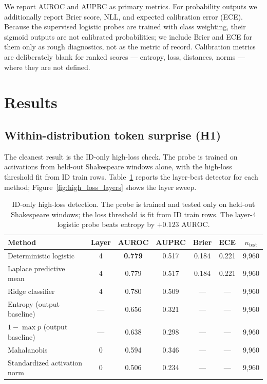 \documentclass[11pt]{article}
\begin{document}
We report AUROC and AUPRC as primary metrics. For probability outputs we additionally report Brier score, NLL, and expected calibration error (ECE). Because the supervised logistic probes are trained with class weighting, their sigmoid outputs are not calibrated probabilities; we include Brier and ECE for them only as rough diagnostics, not as the metric of record. Calibration metrics are deliberately blank for ranked scores --- entropy, loss, distances, norms --- where they are not defined.

\section{Results}

\subsection{Within-distribution token surprise (H1)}

The cleanest result is the ID-only high-loss check. The probe is trained on activations from held-out Shakespeare windows alone, with the high-loss threshold fit from ID train rows. Table~\ref{tab:idonly} reports the layer-best detector for each method; Figure~\ref{fig:high_loss_layers} shows the layer sweep.

\begin{table}[h]
  \centering
  \small
  \begin{tabular}{lcccccc}
    \toprule
    Method & Layer & AUROC & AUPRC & Brier & ECE & $n_{\mathrm{test}}$ \\
    \midrule
    Deterministic logistic       & 4 & \textbf{0.779} & 0.517 & 0.184 & 0.221 & 9{,}960 \\
    Laplace predictive mean      & 4 & 0.779 & 0.517 & 0.184 & 0.221 & 9{,}960 \\
    Ridge classifier             & 4 & 0.780 & 0.509 & ---   & ---   & 9{,}960 \\
    Entropy (output baseline)    & --- & 0.656 & 0.321 & ---   & ---   & 9{,}960 \\
    $1-\max p$ (output baseline) & --- & 0.638 & 0.298 & ---   & ---   & 9{,}960 \\
    Mahalanobis                  & 0 & 0.594 & 0.346 & ---   & ---   & 9{,}960 \\
    Standardized activation norm & 0 & 0.506 & 0.234 & ---   & ---   & 9{,}960 \\
    \bottomrule
  \end{tabular}
  \caption{ID-only high-loss detection. The probe is trained and tested only on held-out Shakespeare windows; the loss threshold is fit from ID train rows. The layer-4 logistic probe beats entropy by $+0.123$ AUROC.}
  \label{tab:idonly}
\end{table}
\end{document}

